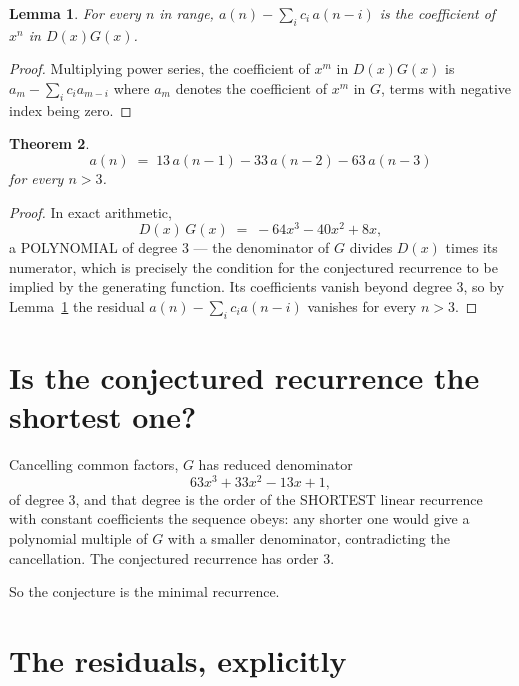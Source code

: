 \documentclass[11pt,a4paper]{article}
\theoremstyle{plain}
\newtheorem{theorem}{Theorem}
\newtheorem{lemma}[theorem]{Lemma}
\theoremstyle{definition}
\begin{document}
\begin{lemma}\label{lem:key}
For every $n$ in range, $a(n)-\sum_i c_i\,a(n-i)$ is the coefficient of $x^{n}$ in
$D(x)G(x)$.
\end{lemma}

\begin{proof}
Multiplying power series, the coefficient of $x^{m}$ in $D(x)G(x)$ is
$a_m-\sum_i c_i a_{m-i}$ where $a_m$ denotes the coefficient of $x^{m}$ in $G$, terms with
negative index being zero.
\end{proof}

\begin{theorem}
\[
a(n)\;=\;13\,a(n-1) - 33\,a(n-2) - 63\,a(n-3)
\]
for every $n>3$.
\end{theorem}

\begin{proof}
In exact arithmetic,
\[
D(x)\,G(x)\;=\;- 64 x^{3} - 40 x^{2} + 8 x,
\]
a POLYNOMIAL of degree $3$ --- the denominator of $G$ divides $D(x)$ times its numerator,
which is precisely the condition for the conjectured recurrence to be implied by the
generating function. Its coefficients vanish beyond degree $3$, so by
Lemma~\ref{lem:key} the residual $a(n)-\sum_ic_ia(n-i)$ vanishes for every
$n>3$.
\end{proof}

\section{Is the conjectured recurrence the shortest one?}

Cancelling common factors, $G$ has reduced denominator
\[
63 x^{3} + 33 x^{2} - 13 x + 1,
\]
of degree $3$, and that degree is the order of the SHORTEST linear recurrence with
constant coefficients the sequence obeys: any shorter one would give a polynomial multiple of
$G$ with a smaller denominator, contradicting the cancellation. The conjectured recurrence has
order $3$.

So the conjecture is the minimal recurrence.

\section{The residuals, explicitly}
\end{document}
